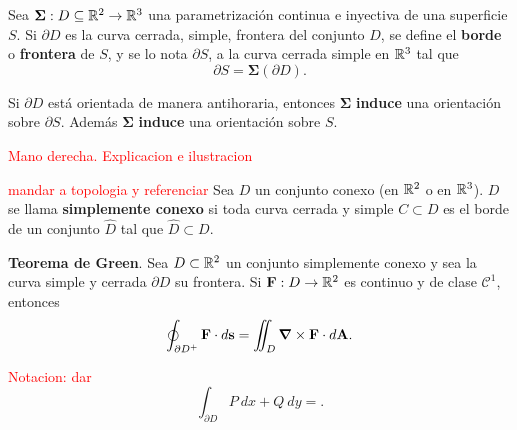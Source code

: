 \begin{definition}
   Sea $\boldsymbol{\Sigma}:D\subseteq\mathbb{R}^2 \to\mathbb{R}^3$ una parametrizaci\'on continua e  inyectiva de una superficie $S$. Si $ \partial D$ es la curva cerrada, simple,  frontera del conjunto $D$,  se define el \textbf{borde} o \textbf{frontera} de $S$, y se lo nota $\partial S$, a la curva cerrada simple en $\mathbb{R}^3$ tal que 
    \[
        \partial S=\boldsymbol{\Sigma}(\partial D).
    \]
\end{definition}

\begin{obs} 
    Si $\partial D$ est\'a orientada de manera antihoraria, entonces $\boldsymbol{\Sigma}$ \textbf{induce} una orientaci\'on sobre $\partial S$. Adem\'as $\boldsymbol{\Sigma}$ \textbf{induce} una orientaci\'on sobre $S$.
\end{obs}

\textcolor{red}{Mano derecha. Explicacion e ilustracion}


\begin{definition} \textcolor{red}{mandar a topologia y referenciar}
    Sea $D$ un conjunto conexo (en $\mathbb{R}^2$ o en $\mathbb{R}^3$).  $D$ se llama \textbf{simplemente conexo}  si toda curva cerrada y  simple  $C\subset D$  es el borde de un conjunto $\hat{D}$ tal que $\hat{D} \subset  D.$
\end{definition}

\begin{theorem}
    \textbf{Teorema de Green}. Sea $D\subset \mathbb{R}^2$ un conjunto simplemente conexo y sea   la curva simple y cerrada  $\partial D$ su frontera. Si  $\mathbf{F}:D\to\mathbb{R}^2$  es continuo y de clase $\mathcal{C}^1$, entonces
    \[
        \oint_{\partial D^{+}} \mathbf{F}\cdot d\mathbf{s} = \iint_D \grad\times\mathbf{F}\cdot d\mathbf{A}.
    \]
\end{theorem}

\begin{obs}  \textcolor{red}{Notacion: dar}
   \[
        \int_{\partial D}P\:dx+Q\:dy=.
\]
\end{obs}




